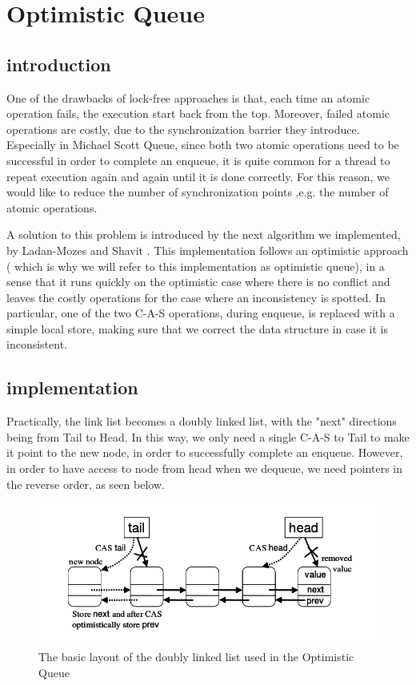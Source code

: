 


\section{Optimistic Queue}

\subsection{introduction}
One of the drawbacks of lock-free approaches is that, each time an atomic operation fails, the execution start back from the top. Moreover, failed atomic operations are costly, due to the synchronization barrier they introduce. Especially in Michael Scott Queue, since both two atomic operations need to be successful in order to complete an enqueue, it is quite common for a thread to repeat execution again and again until it is done correctly. For this reason, we would like to reduce the number of synchronization points ,e.g. the number of atomic operations.

A solution to this problem is introduced by the next algorithm we implemented, by Ladan-Mozes and Shavit \cite{optimistic}. This implementation follows an optimistic approach ( which is why we will refer to this implementation as optimistic queue), in a sense that it runs quickly on the optimistic case where there is no conflict and leaves the costly operations for the case where an inconsistency is spotted. In particular, one of the two C-A-S operations, during enqueue, is replaced with a simple local store, making sure that we correct the data structure in case it is inconsistent.

\subsection{implementation}
Practically, the link list becomes a doubly linked list, with the "next" directions being from Tail to Head. In this way, we only need a single C-A-S to Tail to make it point to the new node, in order to successfully complete an enqueue. However, in order to have access to node from head when we dequeue, we need pointers in the reverse order, as seen below.

\begin{figure}
 \centering
  \includegraphics[scale=0.6]{optimistic_struct.png}
 \caption{ The basic layout of the doubly linked list used in the Optimistic Queue}
\end{figure}

